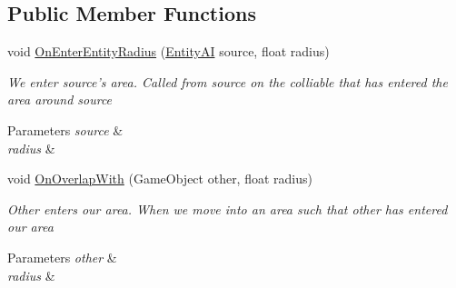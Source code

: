 \subsection*{Public Member Functions}
\begin{DoxyCompactItemize}
\item 
\hypertarget{class_skyrates_1_1_entity_1_1_entity_mooring_ab02449c71583baf95a8e7ee93ea5ed6e}{void \hyperlink{class_skyrates_1_1_entity_1_1_entity_mooring_ab02449c71583baf95a8e7ee93ea5ed6e}{On\-Enter\-Entity\-Radius} (\hyperlink{class_skyrates_1_1_entity_1_1_entity_a_i}{Entity\-A\-I} source, float radius)}\label{class_skyrates_1_1_entity_1_1_entity_mooring_ab02449c71583baf95a8e7ee93ea5ed6e}

\begin{DoxyCompactList}\small\item\em We enter source's area. Called from source on the colliable that has entered the area around source 


\begin{DoxyParams}{Parameters}
{\em source} & \\
\hline
{\em radius} & \\
\hline
\end{DoxyParams}
 \end{DoxyCompactList}\item 
\hypertarget{class_skyrates_1_1_entity_1_1_entity_mooring_af20bacf6321aec707732cd487bcbe812}{void \hyperlink{class_skyrates_1_1_entity_1_1_entity_mooring_af20bacf6321aec707732cd487bcbe812}{On\-Overlap\-With} (Game\-Object other, float radius)}\label{class_skyrates_1_1_entity_1_1_entity_mooring_af20bacf6321aec707732cd487bcbe812}

\begin{DoxyCompactList}\small\item\em Other enters our area. When we move into an area such that other has entered our area 


\begin{DoxyParams}{Parameters}
{\em other} & \\
\hline
{\em radius} & \\
\hline
\end{DoxyParams}
 \end{DoxyCompactList}\end{DoxyCompactItemize}
